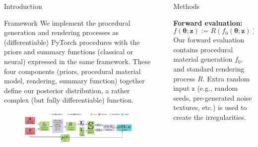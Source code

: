 \documentclass[final]{beamer}
\newlength{\sepwid}
\newlength{\twocolwid}
\newcommand{\bz}{\bm{z}}
\newcommand{\btheta}{\bm{\theta}}
\begin{document}
\begin{frame}[t]
\begin{columns}[t]
\begin{column}{\twocolwid}
\begin{block}{Introduction}
        \end{block}
        
        \vspace{2cm}
        
        \begin{block}{Framework}
            \large{
                We implement the procedural generation and rendering processes as (differentiable) PyTorch procedures with the priors and summary functions (classical or neural) expressed in the same framework. These four components (priors, procedural material model, rendering, summary function) together define our posterior distribution, a rather complex (but fully differentiable) function.
            }
            \begin{figure}[t]
            	\includegraphics[width=\textwidth]{images/other/framework.pdf}
            \end{figure}
        \end{block}
    \end{column} %
    
    \begin{column}{\sepwid}\end{column} %
    \begin{column}{\twocolwid} %
        \begin{block}{Methods}
        \large{
            \textbf{Forward evaluation:}
            \begin{equation*}
                f(\btheta; \bz) := R(f_0(\btheta; \bz))
            \end{equation*}
            Our forward evaluation contains procedural material generation $f_0$, and standard rendering process $R$. Extra random input z (e.g., random seeds, pre-generated noise textures, etc.) is used to create the irregularities.
        
            \vspace{0.5cm}
            
}
\end{block}
\end{column}
\end{columns}
\end{frame}
\end{document}
